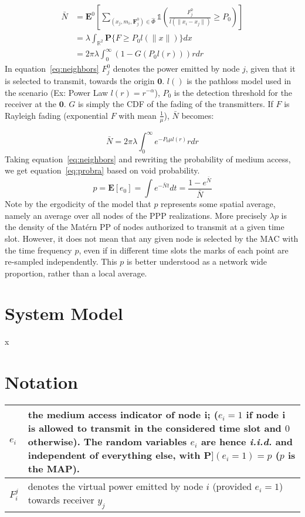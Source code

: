 \documentclass[a4paper]{article}
\begin{document}
%
\begin{equation}\label{eq:neighbors}
  \begin{split}
  \bar{N} &= \textbf{E}^0[\sum_{(x_j,m_i,\textbf{F}_j^0)\in\hat{\Phi}}\mathbb{1}(\frac{F_j^0}{l(\|x_i-x_j\|)}\geq P_0)] \\
  &= \lambda\int_{\mathbb{R}^2} \textbf{P}\{F\geq P_0l(\|x\|) \}dx \\
  &= 2\pi \lambda \int_0^\infty (1-G(P_0l(r)))rdr
\end{split}
\end{equation}
%
In equation~\eqref{eq:neighbors} $F_j^0$ denotes the power emitted by node $j$, given that it is selected to transmit, towards the origin $\textbf{0}$.  $l()$ is the pathloss model used in the scenario (Ex: Power Law $l(r)=r^{-\alpha}$),  $P_0$ is the detection threshold for the receiver at the $\textbf{0}$.  $G$ is simply the CDF of the fading of the transmitters.  If $F$ is Rayleigh fading (exponential $F$ with mean $\frac{1}{\mu}$), $\bar{N}$ becomes:\par
%
\begin{equation}
  \bar{N} = 2 \pi \lambda \int_0^\infty  e^{-P_0 \mu l(r)} r dr
\end{equation}
%
Taking equation~\eqref{eq:neighbors} and rewriting the probability of medium access, we get equation~\eqref{eq:probra} based on void probability.
%
\begin{equation}\label{eq:probra}
  p = \textbf{E}[e_0] = \int e^{-\bar{N}t} dt= \frac{1-e^{\bar{N}}}{\bar{N}}
\end{equation}
%
Note by the ergodicity of the model that $p$ represents some spatial average, namely an average over all nodes of the PPP realizations. More precisely $\lambda p$ is the density of the Mat\'ern PP of nodes authorized to transmit at a given time slot. However, it does not mean that any given
node is selected by the MAC with the time frequency $p$, even if in different time slots the marks of each point are re-sampled independently.  This $p$ is better understood as a network wide proportion, rather than a local average.



\section{System Model}
x

\section{Notation}
%
\begin{tabular}{ l | p{10cm} }
  $e_i$ & the medium access indicator of node i; ($e_i = 1$ if node i is allowed to transmit in the considered time slot and $0$ otherwise). The random variables $e_i$ are hence \textit{i.i.d.} and independent of everything else, with $\textbf{P}](e_i = 1) = p$ ($p$ is the MAP). \\
  \hline
  $F_i^j$ & denotes the virtual power emitted by node $i$ (provided $e_i = 1$) towards receiver $y_j$ \\
  \hline
\end{tabular}


%

%
\end{document}
